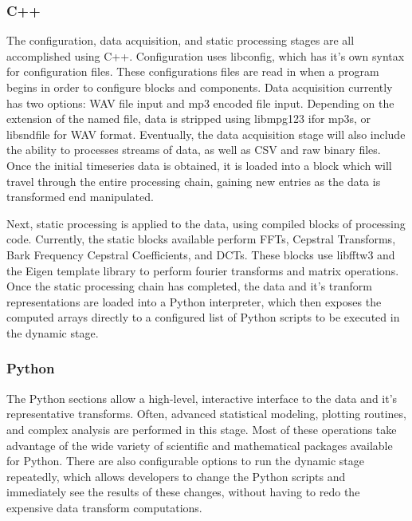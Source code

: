 \documentclass[journal]{IEEEtran}
\begin{document}
\subsubsection{C++}
The configuration, data acquisition, and static processing stages are all accomplished using C++. Configuration uses libconfig, which 
has it's own syntax for configuration files. These configurations files are read in when a program begins in order to configure blocks and 
components. Data acquisition currently has two options: WAV file input and mp3 encoded file input. Depending on the extension of the named file, 
data is stripped using libmpg123 ifor mp3s, or libsndfile for WAV format. Eventually, the data acquisition stage will also include the ability to processes streams of data, as well as CSV and raw binary files. Once the initial timeseries data is obtained, it is loaded into a block which will travel through the entire processing chain, gaining new entries as the data is transformed end manipulated. 

Next, static processing is applied to the data, using compiled blocks of processing code. Currently, the static blocks available perform FFTs, 
Cepstral Transforms, Bark Frequency Cepstral Coefficients, and DCTs. These blocks use libfftw3 and the Eigen template library to perform 
fourier transforms and matrix operations. Once the static processing chain has completed, the data and it's tranform representations are 
loaded into a Python interpreter, which then exposes the computed arrays directly to a configured list of Python scripts to be executed in the dynamic
stage.

\subsubsection{Python}
The Python sections allow a high-level, interactive interface to the data and it's representative transforms. Often, advanced statistical modeling, 
plotting routines, and complex analysis are performed in this stage. Most of these operations take advantage of the wide variety of scientific 
and mathematical packages available for Python. There are also configurable options to run the dynamic stage repeatedly, which allows developers to change the Python scripts and immediately see the results of these changes, without having to redo the expensive data transform computations.
\end{document}
